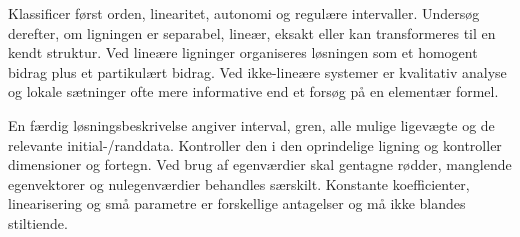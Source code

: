 Klassificer først orden, linearitet, autonomi og regulære intervaller.
Undersøg derefter, om ligningen er separabel, lineær, eksakt eller kan
transformeres til en kendt struktur. Ved lineære ligninger organiseres
løsningen som et homogent bidrag plus et partikulært bidrag. Ved
ikke-lineære systemer er kvalitativ analyse og lokale sætninger ofte
mere informative end et forsøg på en elementær formel.

En færdig løsningsbeskrivelse angiver interval, gren, alle mulige
ligevægte og de relevante initial-/randdata. Kontroller den i den
oprindelige ligning og kontroller dimensioner og fortegn. Ved brug af
egenværdier skal gentagne rødder, manglende egenvektorer og nulegenværdier
behandles særskilt. Konstante koefficienter, linearisering og små
parametre er forskellige antagelser og må ikke blandes stiltiende.
